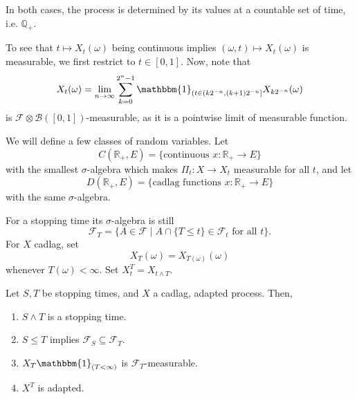 \documentclass[12pt]{article}
\begin{document}
In both cases, the process is determined by its values at a countable set of time, i.e. $\mathbb{Q}_+$.

To see that $t \mapsto X_t(\omega)$ being continuous implies $(\omega, t) \mapsto X_t(\omega)$ is measurable, we first restrict to $t \in [0, 1]$. Now, note that
\[
X_t(\omega) = \lim_{n \to \infty} \sum_{k = 0}^{2^{n}-1} \mathbbm{1}_{(t \in (k 2^{-n}, (k+1)2^{-n}]} X_{k 2^{-n}}(\omega)
\]
is $\mathcal{F} \otimes \mathcal{B}([0, 1])$-measurable, as it is a pointwise limit of measurable function.

We will define a few classes of random variables. Let
\[
	C(\mathbb{R}_+, E) = \{\text{continuous } x : \mathbb{R}_+ \to E\}
\]
with the smallest $\sigma$-algebra which makes $\Pi_t : X \to X_t$ measurable for all $t$, and let
\[
	D(\mathbb{R}_+, E) = \{\text{cadlag functions } x : \mathbb{R}_+ \to E\}
\]
with the same $\sigma$-algebra.

For a stopping time its $\sigma $-algebra is still
\[
	\mathcal{F}_T = \{A \in \mathcal{F} \mid A \cap \{T \leq t\} \in \mathcal{F}_t \text{ for all }t \}.
\]
For $X$ cadlag, set
\[
X_T(\omega) = X_{T(\omega)}(\omega)
\]
whenever $T(\omega) < \infty$. Set $X^{T}_t = X_{t \wedge T}$.

\begin{proposition}
	Let $S, T$ be stopping times, and $X$ a cadlag, adapted process. Then,
	\begin{enumerate}[\normalfont(i)]
		\item $S \wedge T$ is a stopping time.
		\item $S \leq T$ implies $\mathcal{F}_S \subseteq \mathcal{F}_T$.
		\item $X_T \mathbbm{1}_{(T < \infty)}$ is $\mathcal{F}_T$-measurable.
		\item $X^T$ is adapted.
	\end{enumerate}
\end{proposition}
\end{document}
